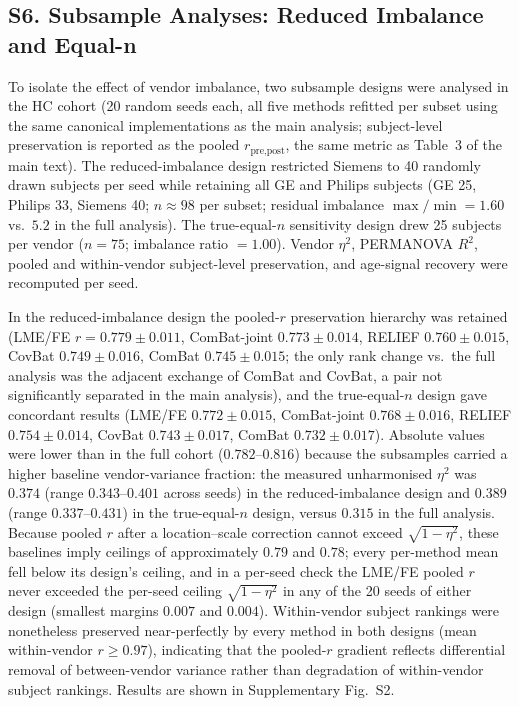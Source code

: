 \documentclass[12pt,a4paper]{article}
\begin{document}
\subsection*{S6. Subsample Analyses: Reduced Imbalance and Equal-n}

To isolate the effect of vendor imbalance, two subsample designs were analysed in the HC cohort (20 random seeds each, all five methods refitted per subset using the same canonical implementations as the main analysis; subject-level preservation is reported as the pooled $r_{\text{pre,post}}$, the same metric as Table~3 of the main text). The reduced-imbalance design restricted Siemens to 40 randomly drawn subjects per seed while retaining all GE and Philips subjects (GE 25, Philips 33, Siemens 40; $n\approx98$ per subset; residual imbalance $\max/\min=1.60$ vs.\ $5.2$ in the full analysis). The true-equal-$n$ sensitivity design drew 25 subjects per vendor ($n=75$; imbalance ratio $=1.00$). Vendor $\eta^2$, PERMANOVA $R^2$, pooled and within-vendor subject-level preservation, and age-signal recovery were recomputed per seed.

In the reduced-imbalance design the pooled-$r$ preservation hierarchy was retained (LME/FE $r=0.779\pm0.011$, ComBat-joint $0.773\pm0.014$, RELIEF $0.760\pm0.015$, CovBat $0.749\pm0.016$, ComBat $0.745\pm0.015$; the only rank change vs.\ the full analysis was the adjacent exchange of ComBat and CovBat, a pair not significantly separated in the main analysis), and the true-equal-$n$ design gave concordant results (LME/FE $0.772\pm0.015$, ComBat-joint $0.768\pm0.016$, RELIEF $0.754\pm0.014$, CovBat $0.743\pm0.017$, ComBat $0.732\pm0.017$). Absolute values were lower than in the full cohort ($0.782$--$0.816$) because the subsamples carried a higher baseline vendor-variance fraction: the measured unharmonised $\eta^2$ was $0.374$ (range $0.343$--$0.401$ across seeds) in the reduced-imbalance design and $0.389$ (range $0.337$--$0.431$) in the true-equal-$n$ design, versus $0.315$ in the full analysis. Because pooled $r$ after a location--scale correction cannot exceed $\sqrt{1-\eta^2}$, these baselines imply ceilings of approximately $0.79$ and $0.78$; every per-method mean fell below its design's ceiling, and in a per-seed check the LME/FE pooled $r$ never exceeded the per-seed ceiling $\sqrt{1-\eta^2}$ in any of the 20 seeds of either design (smallest margins $0.007$ and $0.004$). Within-vendor subject rankings were nonetheless preserved near-perfectly by every method in both designs (mean within-vendor $r\geq0.97$), indicating that the pooled-$r$ gradient reflects differential removal of between-vendor variance rather than degradation of within-vendor subject rankings. Results are shown in Supplementary Fig.~S2.
\end{document}
